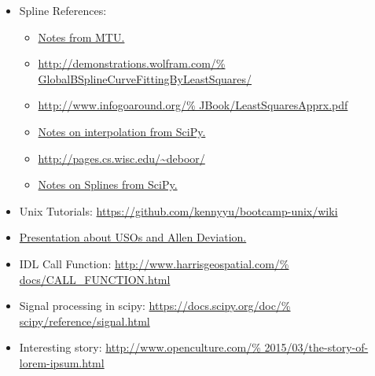 \documentclass[crop=false,class=article,oneside]{standalone}
\begin{document}
\begin{itemize}[itemsep=0pt]
{                            ec48ec4cae25_story.html?utm_term%
                            =.4aad5c52355d}{Article about Cassini.}
                \item Spline References:
                \begin{itemize}
                    \item \href{http://www.cs.mtu.edu/%
                                ~shene/COURSES/cs3621/NOTES/%
                                INT-APP/CURVE-APP-global.html}
                               {Notes from MTU.}
                    \item \url{http://demonstrations.wolfram.com/%
                               GlobalBSplineCurveFittingByLeastSquares/}
                    \item \url{http://www.infogoaround.org/%
                               JBook/LeastSquaresApprx.pdf}
                    \item \href{https://docs.scipy.org/doc/%
                                scipy-0.15.1/reference/generated/%
                                scipy.interpolate.splrep.html}
                               {Notes on interpolation from SciPy.}
                    \item \url{http://pages.cs.wisc.edu/~deboor/}
                    \item \href{https://docs.scipy.org/doc/%
                                scipy/reference/generated/%
                                scipy.interpolate.splrep.html}
                               {Notes on Splines from SciPy.}
                \end{itemize}
                \item Unix Tutorials:
                    \url{https://github.com/kennyyu/bootcamp-unix/wiki}
                \item \href{https://websites.isae-supaero.fr/%
                            IMG/pdf/uso-toulouse.pdf}
                           {Presentation about USOs and Allen Deviation.}
                \item IDL Call Function:
                      \url{http://www.harrisgeospatial.com/%
                           docs/CALL_FUNCTION.html}
                \item Signal processing in scipy:
                      \url{https://docs.scipy.org/doc/%
                           scipy/reference/signal.html}
                \item Interesting story:
                      \url{http://www.openculture.com/%
                           2015/03/the-story-of-lorem-ipsum.html}

\end{itemize}
\end{document}
